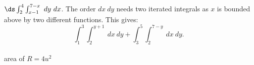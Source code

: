 {\noindent \begin{minipage}{\linewidth}
\end{minipage}
}
{$\ds\int_2^4\int_{x-1}^{7-x}\ dy\ dx$. The order $dx\ dy$ needs two iterated integrals as $x$ is bounded above by two different functions. This gives: 
$$\int_{1}^3\int_{2}^{y+1}\ dx\ dy+\int_{3}^5\int_{2}^{7-y}\ dx\ dy.$$\\
area  of $R = 4u^2$
}
